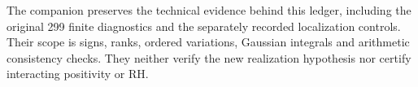 The companion preserves the technical evidence behind this ledger,
including the original 299 finite diagnostics and the separately
recorded localization controls. Their scope is signs, ranks,
ordered variations, Gaussian integrals and arithmetic consistency checks. They neither verify the
new realization hypothesis nor certify interacting positivity or RH.
